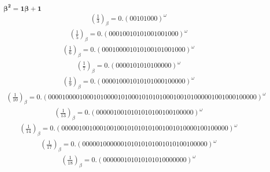 \documentclass[fleqn]{article}
\begin{document}
$\boldsymbol{\beta^2 = 1\beta + 1}$
\begin{equation*}
\begin{split}
(\frac{1}{3})_\beta = 0.(00101000)^\omega
\end{split}\end{equation*}
\begin{equation*}
\begin{split}
(\frac{1}{5})_\beta = 0.(00010010101001001000)^\omega
\end{split}\end{equation*}
\begin{equation*}
\begin{split}
(\frac{1}{6})_\beta = 0.(000100001010100101001000)^\omega
\end{split}\end{equation*}
\begin{equation*}
\begin{split}
(\frac{1}{7})_\beta = 0.(0000101010100000)^\omega
\end{split}\end{equation*}
\begin{equation*}
\begin{split}
(\frac{1}{9})_\beta = 0.(000010001010101000100000)^\omega
\end{split}\end{equation*}
\begin{equation*}
\begin{split}
(\frac{1}{10})_\beta = 0.(000010000100010100001010001010101000100101000001001000100000)^\omega
\end{split}\end{equation*}
\begin{equation*}
\begin{split}
(\frac{1}{13})_\beta = 0.(0000010010101010100100100000)^\omega
\end{split}\end{equation*}
\begin{equation*}
\begin{split}
(\frac{1}{14})_\beta = 0.(000001001000100100101010101001001010000100100000)^\omega
\end{split}\end{equation*}
\begin{equation*}
\begin{split}
(\frac{1}{17})_\beta = 0.(000001000000101010101001010100100000)^\omega
\end{split}\end{equation*}
\begin{equation*}
\begin{split}
(\frac{1}{18})_\beta = 0.(000000101010101010000000)^\omega
\end{split}\end{equation*}
\end{document}
